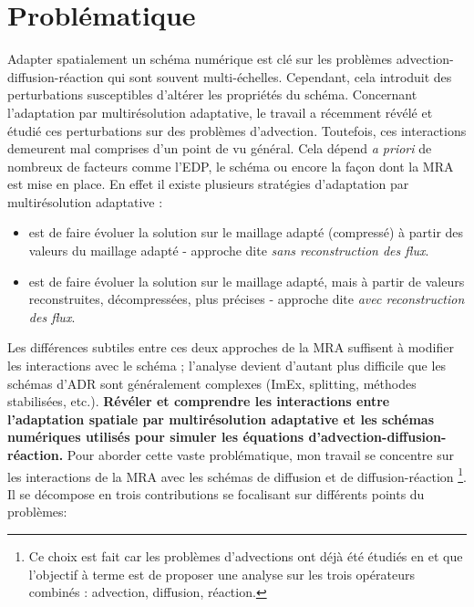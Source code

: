     \section{Problématique}
    \label{par:problematique}
        Adapter spatialement un schéma numérique est clé sur les problèmes advection-diffusion-réaction qui sont souvent multi-échelles.
        Cependant, cela introduit des perturbations susceptibles d'altérer les propriétés du schéma.
        Concernant l'adaptation par multirésolution adaptative, le travail \cite{belloti_et_al_2025} a récemment révélé et étudié 
        ces perturbations sur des problèmes d'advection. 
        Toutefois, ces interactions demeurent mal comprises d'un point de vu général.
        Cela dépend \emph{a priori} de nombreux de facteurs comme l'EDP, le schéma ou encore la façon dont la MRA est mise en place. 
        En effet il existe plusieurs stratégies d'adaptation par multirésolution adaptative : 
        \begin{itemize}
            \item {} est de faire évoluer la solution sur le maillage adapté (compressé) à partir des valeurs du maillage adapté - approche dite \emph{sans reconstruction des flux}.
            \item {} est de faire évoluer la solution sur le maillage adapté, mais à partir de valeurs reconstruites, décompressées, plus précises - approche dite \emph{avec reconstruction des flux}.
        \end{itemize}
        Les différences subtiles entre ces deux approches de la MRA suffisent à modifier les interactions avec le schéma ;
        l'analyse devient d’autant plus difficile que les schémas d’ADR sont généralement complexes (ImEx, splitting, méthodes stabilisées, etc.).
        \medskip
    \textbf{Révéler et comprendre les interactions entre l'adaptation spatiale par multirésolution adaptative et les schémas numériques 
    utilisés pour simuler les équations d'advection-diffusion-réaction.}
    Pour aborder cette vaste problématique, mon travail se concentre sur les interactions de la MRA avec les schémas de diffusion et de diffusion-réaction
    \footnote{Ce choix est fait car les problèmes d'advections ont déjà été étudiés en \cite{belloti_et_al_2025} et que l'objectif à terme est de proposer une analyse
    sur les trois opérateurs combinés : advection, diffusion, réaction.}. Il se décompose en trois contributions se focalisant sur différents points du problèmes:

